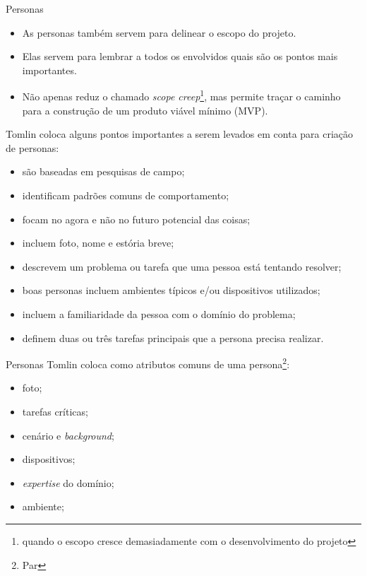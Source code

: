 \documentclass[11pt]{beamer}
\begin{document}
   \begin{frame}{Personas}
      \begin{itemize}
         \item As personas também servem para delinear o escopo do projeto.
         \item Elas servem para lembrar a todos os envolvidos quais são os pontos mais importantes.
         \item Não apenas reduz o chamado \textit{scope creep}\footnote{quando o escopo cresce demasiadamente com o desenvolvimento do projeto}, mas permite traçar o caminho para a construção de um produto viável mínimo (MVP).
      \end{itemize}
   \end{frame}

   \begin{frame}
      Tomlin coloca alguns pontos importantes a serem levados em conta para criação de personas:
      \begin{itemize}
         \item são baseadas em pesquisas de campo;
         \item identificam padrões comuns de comportamento;
         \item focam no agora e não no futuro potencial das coisas;
         \item incluem foto, nome e estória breve;
         \item descrevem um problema ou tarefa que uma pessoa está tentando resolver;
         \item boas personas incluem ambientes típicos e/ou dispositivos utilizados;
         \item incluem a familiaridade da pessoa com o domínio do problema;
         \item definem duas ou três tarefas principais que a persona precisa realizar.
      \end{itemize}
   \end{frame}

   \begin{frame}{Personas}
      Tomlin coloca como atributos comuns de uma persona\footnote{Par}:
      \begin{itemize}
         \item foto;
         \item tarefas críticas;
         \item cenário e \textit{background};
         \item dispositivos;
         \item \textit{expertise} do domínio;
         \item ambiente;         
       \end{itemize}
   \end{frame}
\end{document}
